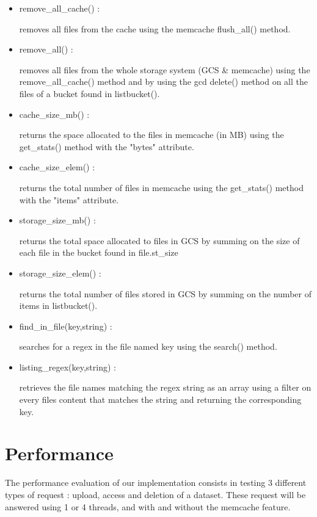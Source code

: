 \documentclass{article}
\begin{document}
\begin{itemize}
	\item remove\_all\_cache() :

	removes all files from the cache using the memcache flush\_all() method.

	\item remove\_all() :

	removes all files from the whole storage system (GCS \& memcache) using the remove\_all\_cache() method and by using the gcd delete() method on all the files of a bucket found in listbucket().

	\item cache\_size\_mb() :

	returns the space allocated to the files in memcache (in MB) using the get\_stats() method with the "bytes" attribute.

	\item cache\_size\_elem() :

	returns the total number of files in memcache using the get\_stats() method with the "items" attribute.

	\item storage\_size\_mb() :

	returns the total space allocated to files in GCS by summing on the size of each file in the bucket found in file.st\_size

	\item storage\_size\_elem() :

	returns the total number of files stored in GCS by summing on the number of items in listbucket().

	\item find\_in\_file(key,string) :

	searches for a regex in the file named key using the search() method.

	\item listing\_regex(key,string) :

	retrieves the file names matching the regex string as an array using a filter on every files content that matches the string and returning the corresponding key.\\

\end{itemize}



\section{Performance}

The performance evaluation of our implementation consists in testing 3 different types of request : upload, access and deletion of a dataset. These request will be answered using 1 or 4 threads, and with and without the memcache feature.
\end{document}
